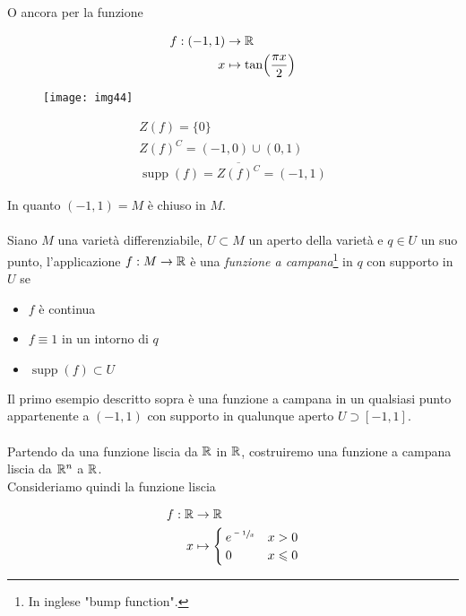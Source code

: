 O ancora per la funzione

\begin{align}
	\begin{split}
		f : (-1,1) &\to \mathbb{R}\\
		x &\mapsto \tan(\dfrac{\pi x}{2})
	\end{split}
\end{align}

\begin{figure}[H]
	\centering
	\texttt{[image: img44]}
\end{figure}

\begin{gather}
	Z(f) = \{0\}\\
	Z(f)^{C} = (-1,0) \cup (0,1)\\
	\operatorname{supp}(f) = \overline{Z(f)^{C}} = (-1,1)
\end{gather}

In quanto $ (-1,1) = M $ è chiuso in $ M $.\\\\
%
Siano $ M $ una varietà differenziabile, $ U \subset M $ un aperto della varietà e $ q \in U $ un suo punto, l'applicazione $ f : M \to \mathbb{R} $ è una \textit{funzione a campana}\footnote{%
	In inglese "bump function".%
} in $ q $ con supporto in $ U $ se

\begin{itemize}
	\item $ f $ è continua
	
	\item $ f \equiv 1 $ in un intorno di $ q $
	
	\item $ \operatorname{supp}(f) \subset U $
\end{itemize}

Il primo esempio descritto sopra è una funzione a campana in un qualsiasi punto appartenente a $ (-1,1) $ con supporto in qualunque aperto $ U \supset [-1,1] $.\\\\
%
Partendo da una funzione liscia da $ \mathbb{R} $ in $ \mathbb{R} $, costruiremo una funzione a campana liscia da $ \mathbb{R}^{n} $ a $ \mathbb{R} $.\\
Consideriamo quindi la funzione liscia

\begin{align}
	\begin{split}
		f : \R &\to \R\\
		x &\mapsto%
		\begin{cases}
			e^{\sfrac{-1}{x}} & x > 0\\
			0 & x \leqslant 0
		\end{cases}
	\end{split}
\end{align}

